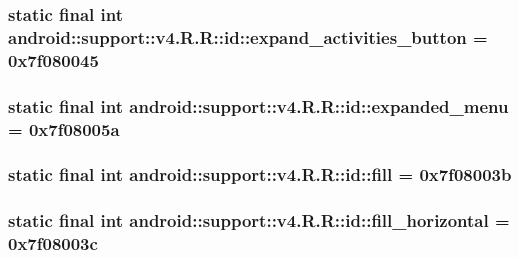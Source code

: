 \hypertarget{classandroid_1_1support_1_1v4_1_1_r_1_1id_bfd6c2ad24d10146ad302cca95f26a2f}{
\subsubsection[{expand\_\-activities\_\-button}]{\setlength{\rightskip}{0pt plus 5cm}static final int android::support::v4.R.R::id::expand\_\-activities\_\-button = 0x7f080045}}
\label{classandroid_1_1support_1_1v4_1_1_r_1_1id_bfd6c2ad24d10146ad302cca95f26a2f}


\hypertarget{classandroid_1_1support_1_1v4_1_1_r_1_1id_4bfa440a1b3d5cd877b3341ebbc6c5ec}{
\subsubsection[{expanded\_\-menu}]{\setlength{\rightskip}{0pt plus 5cm}static final int android::support::v4.R.R::id::expanded\_\-menu = 0x7f08005a}}
\label{classandroid_1_1support_1_1v4_1_1_r_1_1id_4bfa440a1b3d5cd877b3341ebbc6c5ec}


\hypertarget{classandroid_1_1support_1_1v4_1_1_r_1_1id_8a09f97fdc47df50892ad209711763eb}{
\subsubsection[{fill}]{\setlength{\rightskip}{0pt plus 5cm}static final int android::support::v4.R.R::id::fill = 0x7f08003b}}
\label{classandroid_1_1support_1_1v4_1_1_r_1_1id_8a09f97fdc47df50892ad209711763eb}


\hypertarget{classandroid_1_1support_1_1v4_1_1_r_1_1id_a7bdbd5996d932f244f6e9754c0458da}{
\subsubsection[{fill\_\-horizontal}]{\setlength{\rightskip}{0pt plus 5cm}static final int android::support::v4.R.R::id::fill\_\-horizontal = 0x7f08003c}}
\label{classandroid_1_1support_1_1v4_1_1_r_1_1id_a7bdbd5996d932f244f6e9754c0458da}


